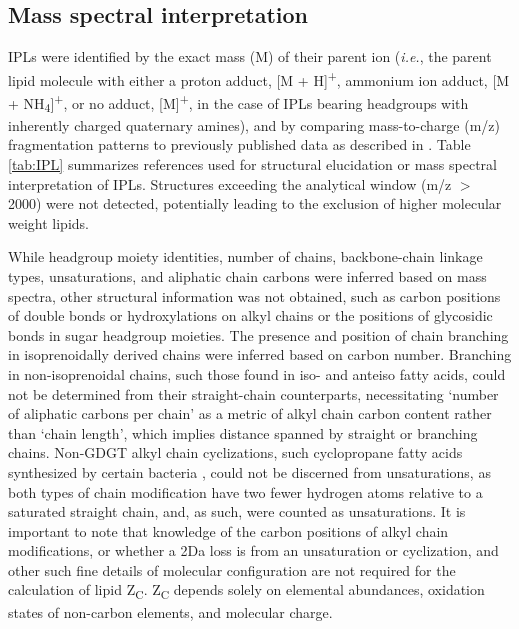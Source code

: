 \subsection{Mass spectral interpretation} IPLs were identified by the exact mass (M) of their parent ion (\textit{i.e.}, the parent lipid molecule with either a proton adduct, [M + H]\textsuperscript{+}, ammonium ion adduct, [M + NH\textsubscript{4}]\textsuperscript{+}, or no adduct, [M]\textsuperscript{+}, in the case of IPLs bearing headgroups with inherently charged quaternary amines), and by comparing mass-to-charge (m/z) fragmentation patterns to previously published data as described in \cite{Sturt_Intact_2004}. Table \ref{tab:IPL} summarizes references used for structural elucidation or mass spectral interpretation of IPLs. Structures exceeding the analytical window (m/z $>$ 2000) were not detected, potentially leading to the exclusion of higher molecular weight lipids.

While headgroup moiety identities, number of chains, backbone-chain linkage types, unsaturations, and aliphatic chain carbons were inferred based on mass spectra, other structural information was not obtained, such as carbon positions of double bonds or hydroxylations on alkyl chains or the positions of glycosidic bonds in sugar headgroup moieties. The presence and position of chain branching in isoprenoidally derived chains were inferred based on carbon number. Branching in non-isoprenoidal chains, such those found in iso- and anteiso fatty acids, could not be determined from their straight-chain counterparts, necessitating `number of aliphatic carbons per chain' as a metric of alkyl chain carbon content rather than `chain length', which implies distance spanned by straight or branching chains. Non-GDGT alkyl chain cyclizations, such cyclopropane fatty acids synthesized by certain bacteria \citep{grogan1997cyclopropane}, could not be discerned from unsaturations, as both types of chain modification have two fewer hydrogen atoms relative to a saturated straight chain, and, as such, were counted as unsaturations. It is important to note that knowledge of the carbon positions of alkyl chain modifications, or whether a 2Da loss is from an unsaturation or cyclization, and other such fine details of molecular configuration are not required for the calculation of lipid Z\textsubscript{C}. Z\textsubscript{C} depends solely on elemental abundances, oxidation states of non-carbon elements, and molecular charge.

